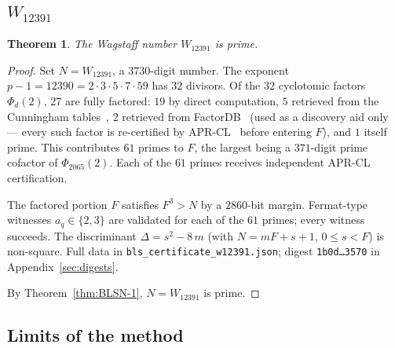 \documentclass[11pt,a4paper]{amsart}
\theoremstyle{plain}
\newtheorem{theorem}{Theorem}[section]
\theoremstyle{definition}
\begin{document}
\subsection{$W_{12391}$}
\label{ssec:w12391}

\begin{theorem}
\label{thm:w12391}
The Wagstaff number $W_{12391}$ is prime.
\end{theorem}

\begin{proof}
Set $N = W_{12391}$, a $3730$-digit number. The exponent $p - 1 =
12390 = 2 \cdot 3 \cdot 5 \cdot 7 \cdot 59$ has $32$ divisors. Of the
$32$ cyclotomic factors $\Phi_d(2)$, $27$ are fully factored: $19$
by direct computation, $5$ retrieved from the Cunningham
tables~\cite{Cunningham}, $2$ retrieved from FactorDB~\cite{FactorDB}
(used as a discovery aid only --- every such factor is re-certified
by APR-CL~\cite{APR,CohenLenstraAlgo} before entering $F$), and $1$
itself prime. This contributes $61$ primes to $F$, the
largest being a $371$-digit prime cofactor of $\Phi_{2065}(2)$. Each
of the $61$ primes receives independent APR-CL certification.

The factored portion $F$ satisfies $F^3 > N$ by a $2860$-bit
margin. Fermat-type witnesses $a_q \in \{2, 3\}$ are validated for
each of the $61$ primes; every witness succeeds. The discriminant
$\Delta = s^2 - 8\, m$ (with $N = m F + s + 1$, $0 \leq s < F$) is
non-square. Full data in \texttt{bls\_certificate\_w12391.json};
digest \texttt{1b0d\ldots 3570} in Appendix~\ref{sec:digests}.

By Theorem~\ref{thm:BLSN-1}, $N = W_{12391}$ is prime.
\end{proof}

\subsection{Limits of the method}
\end{document}
